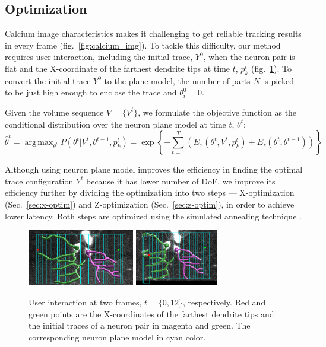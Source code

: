 \documentclass[10pt,letterpaper]{article}
\DeclareMathOperator*{\argmax}{arg\,max}
\begin{document}
\subsection{Optimization}
Calcium image characteristics makes it challenging to get reliable tracking results in every frame (fig.~\ref{fig:calcium_img}). To tackle this difficulty, our method requires user interaction, including the initial trace, $Y^0$, when the neuron pair is flat and the X-coordinate of the farthest dendrite tips at time $t$, $p^t_k$ (fig.~\ref{fig:ui}). To convert the initial trace $Y^0$ to the plane model, the number of parts $N$ is picked to be just high enough to enclose the trace and $\theta_i^0 = 0$.

Given the volume sequence $V = \{V^t\}$, we formulate the objective function as the conditional distribution over the neuron plane model at time $t$, $\theta^t$:
\begin{equation}
\hat{\theta}^t = \argmax_{\theta^t} P(\theta^t | V^t, \theta^{t-1}, p^t_k) = \exp \left\{ - \sum_{t=1}^T \left( E_{x}(\theta^t,V^t, p^t_k) + E_{z}(\theta^t,\theta^{t-1}) \right) \right\}
\end{equation}

Although using neuron plane model improves the efficiency in finding the optimal trace configuration $Y^t$ because it has lower number of DoF, we improve its efficiency further by dividing the optimization into two steps --- X-optimization (Sec.~\ref{sec:x-optim}) and Z-optimization (Sec.~\ref{sec:z-optim}), in order to achieve lower latency. Both steps are optimized using the simulated annealing technique \cite{Kirkpatrick1983}.

\begin{figure}
	\centering
	\includegraphics[height=70pt]{img/user_ui}
	\quad
	\includegraphics[height=70pt]{img/user_ui13}
	\caption{User interaction at two frames, $t=\{0,12\}$, respectively. Red and green points are the X-coordinates of the farthest dendrite tips and the initial traces of a neuron pair in magenta and green. The corresponding neuron plane model in cyan color.}
	\label{fig:ui}
\end{figure}
\end{document}
